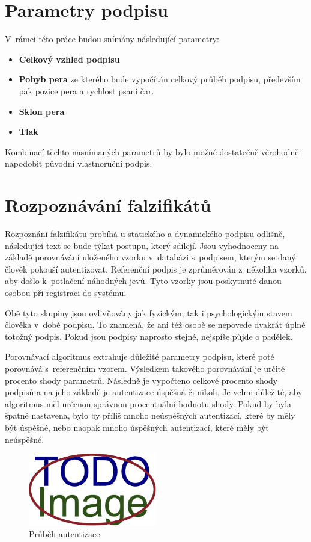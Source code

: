 \section{Parametry podpisu}
V~rámci této práce budou snímány následující parametry:
\begin{itemize}
  \item{\textbf{Celkový vzhled podpisu}}
  \item{\textbf{Pohyb pera} ze kterého bude vypočítán celkový průběh podpisu, především pak pozice pera a rychlost psaní čar.} %
  \item{\textbf{Sklon pera}} %
  \item{\textbf{Tlak}} %
\end{itemize}
Kombinací těchto nasnímaných parametrů by bylo možné dostatečně věrohodně napodobit původní vlastnoruční podpis. 

\section{Rozpoznávání falzifikátů}
Rozpoznání falzifikátu probíhá u statického a dynamického podpisu odlišně, následující text se bude týkat postupu, který sdílejí.
Jsou vyhodnoceny na základě porovnávání uloženého vzorku v~databázi s~podpisem, kterým se daný člověk pokouší autentizovat.
Referenční podpis je zprůměrován z~několika vzorků, aby došlo k~potlačení náhodných jevů. %
Tyto vzorky jsou poskytnuté danou osobou při registraci do systému.

Obě tyto skupiny jsou ovlivňovány jak fyzickým, tak i psychologickým stavem člověka v~době podpisu.
To znamená, že ani též osobě se nepovede dvakrát úplně totožný podpis.
Pokud jsou podpisy naprosto stejné, nejspíše půjde o padělek.

Porovnávací algoritmus extrahuje důležité parametry podpisu, které poté porovnává s~referenčním vzorem. 
Výsledkem takového porovnávání je určité procento shody parametrů.
Následně je vypočteno celkové procento shody podpisů a na jeho základě je autentizace úspěšná či nikoli.
Je velmi důležité, aby algoritmus měl určenou správnou procentuální hodnotu shody.
Pokud by byla špatně nastavena, bylo by příliš mnoho neúspěšných autentizací, které by měly být úspěšné, nebo naopak mnoho úspěšných autentizací, které měly být neúspěšné.

\begin{figure}[h]
  \centering
  \includegraphics[width=0.5\textwidth]{obrazky-figures/placeholder.pdf}
  \caption{Průběh autentizace}
  \label{fig:my-pdf}
\end{figure}

